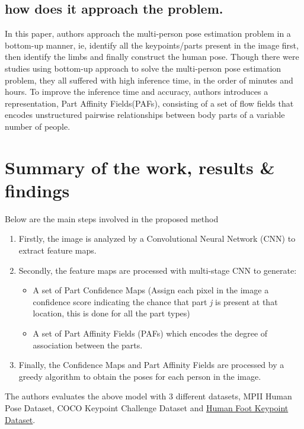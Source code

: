\documentclass[twocolumn]{article}
\begin{document}
\subsection{how does it approach the problem.}
In this paper, authors approach the multi-person pose estimation problem in a bottom-up manner, ie, identify all the keypoints/parts present in the image first, then identify the limbs and finally construct the human pose. Though there were studies using bottom-up approach to solve the multi-person pose estimation problem, they all suffered with high inference time, in the order of minutes and hours. To improve the inference time and accuracy, authors introduces a representation, Part Affinity Fields(PAFs), consisting of a set of flow fields that encodes unstructured pairwise relationships between body parts of a variable number of people.

\section{Summary of the work, results \& findings}
Below are the main steps involved in the proposed method
\begin{enumerate}
	\item Firstly, the image is analyzed by a Convolutional Neural Network (CNN) to extract feature maps.
	\item Secondly, the feature maps are processed with multi-stage CNN to generate: 
	\begin{itemize}
		\item A set of Part Confidence Maps (Assign each pixel in the image a confidence score indicating the chance that  part \emph{j} is present at that location, this is done for all the part types)
		\item  A set of Part Affinity Fields (PAFs) which encodes the degree of association between the parts.
	\end{itemize}
	\item Finally, the Confidence Maps and Part Affinity Fields are processed by a greedy algorithm to obtain the poses for each person in the image.	
\end{enumerate}

The authors evaluates the above model with 3 different datasets, MPII Human Pose Dataset\cite{andriluka20142d}, COCO Keypoint Challenge Dataset\cite{lin2014microsoft} and \href{https://cmu-perceptual-computing-lab.github.io/foot_keypoint_dataset/}{Human Foot Keypoint Dataset}.
\end{document}
